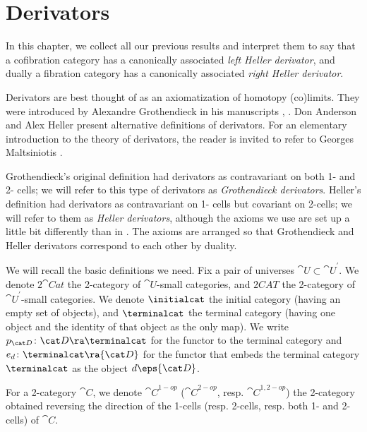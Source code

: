 \chapter{Derivators}
\label{chap:derivators}

In this chapter, we collect all our previous results and interpret them to say that a cofibration category has a canonically associated {\it left Heller derivator}, and dually a fibration category has a canonically associated {\it right Heller derivator}. 

Derivators are best thought of as an axiomatization of homotopy (co)limits. They were introduced by Alexandre Grothendieck in his manuscripts \cite{Grothendieck1}, \cite{Grothendieck2}. Don Anderson \cite{Anderson2} and Alex Heller \cite{Heller} present alternative definitions of derivators. For an elementary introduction to the theory of derivators, the reader is invited to refer to Georges Maltsiniotis \cite{Maltsiniotis1}.

Grothendieck's original definition had derivators as contravariant on both 1- and 2- cells; we will refer to this type of derivators as {\it Grothendieck derivators}. Heller's definition had derivators as contravariant on 1- cells but covariant on 2-cells; we will refer to them as {\it Heller derivators}, although the axioms we use are set up a little bit differently than in \cite{Heller}. The axioms are arranged so that Grothendieck and Heller derivators correspond to each other by duality.

We will recall the basic definitions we need. Fix a pair of universes ${\cat U} \subset {\cat U}^{'}$. We denote $2{\cat Cat}$ the 2-category of ${\cat U}$-small categories, and $2CAT$ the 2-category of ${\cat U}^{'}$-small categories. We denote $\initialcat$ the initial category (having an empty set of objects), and $\terminalcat$ the terminal category (having one object and the identity of that object as the only map). We write $p_{\cat D} \colon {\cat D} \ra \terminalcat$ for the functor to the terminal category and $e_{d} \colon \terminalcat \ra {\cat D}$ for the functor that embeds the terminal category $\terminalcat$ as the object $d \eps {\cat D}$. 

For a 2-category ${\cat C}$, we denote ${\cat C}^{1-op}$ (${\cat C}^{2-op}$, resp. ${\cat C}^{1,2-op}$) the 2-category obtained reversing the direction of the 1-cells (resp. 2-cells, resp. both 1- and 2-cells) of ${\cat C}$.

